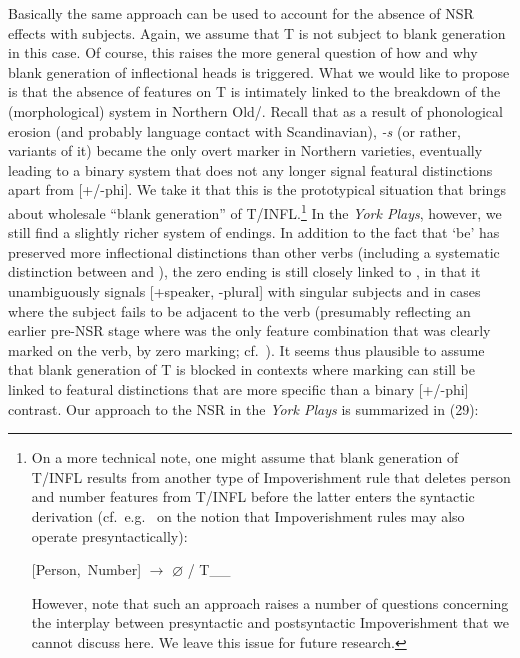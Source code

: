 \documentclass[output=paper]{langsci/langscibook}
\begin{document}
Basically the same approach can be used to account for the absence of \gls{NSR} effects with \Fsg{} subjects. Again, we assume that T is not subject to blank generation in this case. Of course, this raises the more general question of how and why blank generation of inflectional heads is triggered.
What we would like to propose is that the absence of  features on T is
intimately linked to the breakdown of the (morphological)  system in
Northern Old/. Recall that as a result of phonological
erosion (and probably language contact with Scandinavian), \emph{-s} (or
rather, variants of it) became the only overt  marker in Northern
varieties, eventually leading to a binary  system that does not any
longer signal featural distinctions apart from [+/-phi]. We take it  that this
is the prototypical situation that brings about wholesale ``blank generation''
of T/INFL.\footnote{On a more technical note, one might assume that blank
    generation of T/INFL results from another type of Impoverishment rule that
    deletes person and number features from T/INFL before the latter enters the
    syntactic derivation (cf.\ e.g.\ \citealt{Mueller:2006} on the notion that
    Impoverishment rules may also operate presyntactically):

    \begin{exe}
         \mbox{[Person, Number]} {$\rightarrow$ $\varnothing$} / T\_\_\
    \end{exe}

    However, note that such an approach raises a number of questions concerning the
    interplay between presyntactic and postsyntactic Impoverishment that we cannot
    discuss here. We leave this issue for future research.} In the \emph{York
Plays}, however, we still find a slightly richer system of endings. In addition
to the fact that `be' has preserved more inflectional distinctions than other
verbs (including a systematic distinction between \Ssg{} and \Spl{}), the zero
ending is still closely linked to \Fsg{}, in that it unambiguously signals
[+speaker, -plural] with singular subjects and in cases where the subject fails
to be adjacent to the verb (presumably reflecting an earlier pre-\gls{NSR}
stage where \Fsg{} was the only feature combination that was clearly marked on
the verb, by zero marking; cf.\ \Cref{tab:trips:10.2}). It seems thus plausible to
assume that blank generation of T is blocked in contexts where \isi{agreement}
marking can still be linked to featural distinctions that are more specific
than a binary [+/-phi] contrast. Our approach to the \gls{NSR} in the
\emph{York Plays} is summarized in (29):
\end{document}

